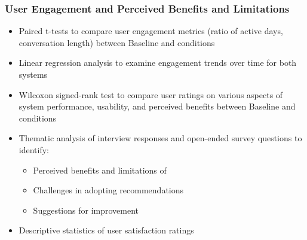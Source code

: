\subsubsection{User Engagement and Perceived Benefits and Limitations}
\begin{itemize}
\item Paired t-tests to compare user engagement metrics (ratio of active days, conversation length) between Baseline and \name{} conditions
\item Linear regression analysis to examine engagement trends over time for both systems
\item Wilcoxon signed-rank test to compare user ratings on various aspects of system performance, usability, and perceived benefits between Baseline and \name{} conditions
\item Thematic analysis of interview responses and open-ended survey questions to identify:
\begin{itemize}
\item Perceived benefits and limitations of \name{}
\item Challenges in adopting recommendations
\item Suggestions for improvement
\end{itemize}
\item Descriptive statistics of user satisfaction ratings
\end{itemize}






